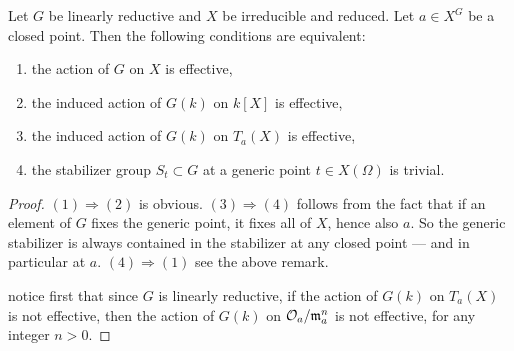 \documentclass[12pt]{article}
\begin{document}
\begin{lemma}[2.4]
Let $G$ be linearly reductive and $X$ be irreducible and reduced.  
Let $a \in X^G$ be a closed point. Then the following conditions are equivalent:
\begin{enumerate}
   \item the action of $G$ on $X$ is effective,
   \item the induced action of $G(k)$ on $k[X]$ is effective,
   \item the induced action of $G(k)$ on $T_a(X)$ is effective,
   \item the stabilizer group $S_t \subset G$ at a generic point $t \in X(\Omega)$ is trivial.
\end{enumerate}
\end{lemma}
\begin{proof}
$(1) \Rightarrow (2)$ is obvious.
$(3) \Rightarrow (4)$ follows from the fact that if an element of $G$ fixes the generic point, it fixes all of $X$, hence also $a$. So the generic stabilizer is always contained in the stabilizer at any closed point — and in particular at $a$.
$(4) \Rightarrow (1)$ see the above remark.

 notice first that since $G$ is linearly reductive, if the action of $G(k)$ on $T_a(X)$ is not effective, then the action of $G(k)$ on ${\mathcal{O}}_a / \mathfrak{m}_a^n$ is not effective, for any integer $n > 0$.
\end{proof}
\end{document}
